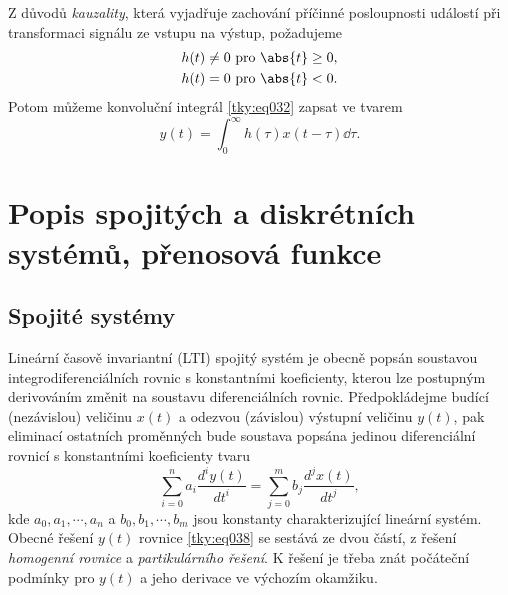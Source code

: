       Z důvodů \emph{kauzality}, která vyjadřuje zachování příčinné posloupnosti událostí při 
      transformaci signálu ze vstupu na výstup, požadujeme
      \begin{align}\label{tky:eq036}
        h(t) &\neq  0 \text{   pro } \abs{t} \geq0, \\
        h(t) &  =   0 \text{   pro } \abs{t} < 0. 
      \end{align}    
      Potom můžeme konvoluční integrál \ref{tky:eq032} zapsat ve tvarem
      \begin{equation}\label{tky:eq037}
         y(t) = \int_0^{\infty}h(\tau)x(t-\tau)\dd\tau.
      \end{equation} 
  
  \section{Popis spojitých a diskrétních systémů, přenosová funkce}\label{tky:IchIIsecIII}
    \subsection{Spojité systémy}\label{tky:IchIIsecIIIssecI}
      Lineární časově invariantní (\textsc{LTI}) spojitý systém je obecně popsán soustavou
      integrodiferenciálních rovnic s konstantními koeficienty, kterou lze postupným derivováním
      změnit na soustavu diferenciálních rovnic. Předpokládejme budící (nezávislou) veličinu
      $x(t)$ a odezvou (závislou) výstupní veličinu $y(t)$, pak eliminací ostatních proměnných bude
      soustava popsána jedinou diferenciální rovnicí s konstantními koeficienty tvaru
      \begin{equation}\label{tky:eq038}
          \sum_{i=0}^na_i\frac{d^iy(t)}{dt^i}=\sum_{j=0}^mb_j\frac{d^jx(t)}{dt^j},
      \end{equation}
      kde $a_0, a_1, \cdots ,a_n$ a $b_0, b_1, \cdots ,b_m$ jsou konstanty charakterizující lineární
      systém. Obecné řešení $y(t)$ rovnice \ref{tky:eq038} se sestává ze dvou částí, z 
      řešení \emph{homogenní rovnice} a \emph{partikulárního řešení}. K řešení je třeba znát 
      počáteční podmínky pro $y(t)$ a jeho derivace ve výchozím okamžiku.
  
